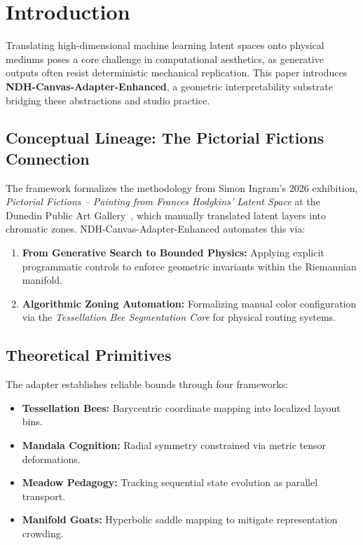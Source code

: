 
\section{Introduction}
\label{sec:introduction}

Translating high-dimensional machine learning latent spaces onto physical mediums poses a core challenge in computational aesthetics, as generative outputs often resist deterministic mechanical replication. This paper introduces \textbf{NDH-Canvas-Adapter-Enhanced}, a geometric interpretability substrate bridging these abstractions and studio practice.

\subsection{Conceptual Lineage: The Pictorial Fictions Connection}

The framework formalizes the methodology from Simon Ingram's 2026 exhibition, \textit{Pictorial Fictions – Painting from Frances Hodgkins' Latent Space} at the Dunedin Public Art Gallery~\cite{ingram2026pictorial}, which manually translated latent layers into chromatic zones. NDH-Canvas-Adapter-Enhanced automates this via:
\begin{enumerate}
    \item \textbf{From Generative Search to Bounded Physics:} Applying explicit programmatic controls to enforce geometric invariants within the Riemannian manifold.
    \item \textbf{Algorithmic Zoning Automation:} Formalizing manual color configuration via the \textit{Tessellation Bee Segmentation Core} for physical routing systems.
\end{enumerate}

\subsection{Theoretical Primitives}

The adapter establishes reliable bounds through four frameworks:
\begin{itemize}
    \item \textbf{Tessellation Bees:} Barycentric coordinate mapping into localized layout bins.
    \item \textbf{Mandala Cognition:} Radial symmetry constrained via metric tensor deformations.
    \item \textbf{Meadow Pedagogy:} Tracking sequential state evolution as parallel transport.
    \item \textbf{Manifold Goats:} Hyperbolic saddle mapping to mitigate representation crowding.
\end{itemize}
